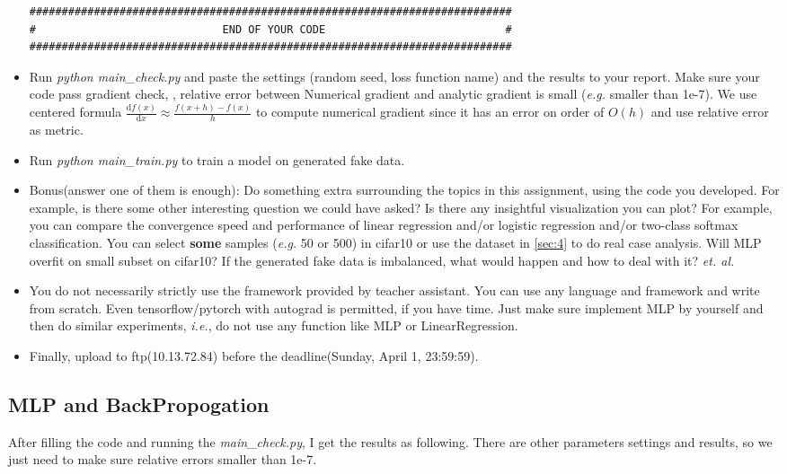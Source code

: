 \documentclass[12pt]{article}
\begin{document}
\begin{itemize}
\begin{verbatim}
###########################################################################
#                             END OF YOUR CODE                            #
###########################################################################
	\end{verbatim}
	\item Run \textit{python main\_check.py} and paste the settings (\eg random seed, loss function name) and the results to  your report.  Make sure your code pass gradient check, \eg, relative error between Numerical gradient and analytic gradient is small (\textit{e.g.} smaller than 1e-7). We use centered formula $\displaystyle \frac{\mathrm{d}f(x)}{\mathrm{d}x} \approx \frac{f(x+h)-f(x)}{h}$ to compute numerical gradient since it has an error on order of $O(h)$ and use relative error as metric.
	\item Run \textit{python main\_train.py} to train a model on generated fake data.
	\item {{Bonus(answer one of them is enough)}}: Do something extra surrounding the topics in this assignment, using the code you developed. For example, is there some other interesting question we could have asked? Is there any insightful visualization you can plot? For example, you can compare the convergence speed and performance of  linear regression and/or logistic regression and/or two-class softmax classification. You can select \textbf{some} samples (\textit{e.g.} 50 or 500) in cifar10 or use the dataset in {\ref{sec:4}} to do real case analysis. Will MLP overfit on small subset on cifar10? If the generated fake data is imbalanced, what would happen and how to deal with it?  \textit{et. al.}
	\item You do not necessarily strictly use the framework provided by teacher assistant. You can use any language and framework and write from scratch.
	      Even tensorflow/pytorch with autograd is permitted, if you have time.
	      Just make sure implement MLP by yourself and then do similar experiments, \textit{i.e.}, do not use any function like MLP or LinearRegression.
	\item Finally, upload to ftp(10.13.72.84) before the deadline(Sunday, April 1, 23:59:59).
\end{itemize}

\subsection{MLP and BackPropogation}

After filling the code and running the \textit{main\_check.py}, I get the results as following. There are other parameters settings and results, so we just need to make sure relative errors smaller than 1e-7.
\end{document}
